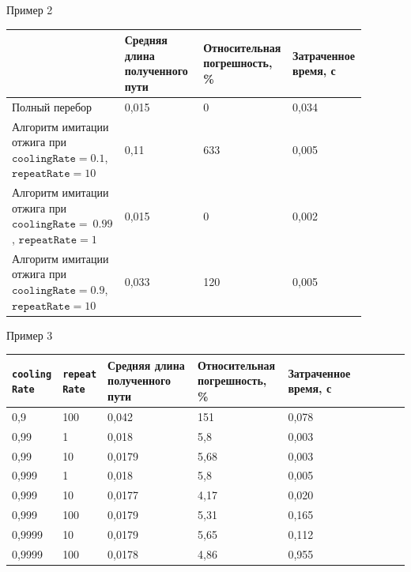 \documentclass[ignoreonframetext,unicode]{beamer}
\begin{document}
\begin{frame}{Пример 2}
\begin{table}[h]
	\small{
	\begin{center}
		\begin{tabular}{|p{0.3\linewidth}|p{0.22\linewidth}|p{0.2\linewidth}|p{0.17\linewidth}|} \hline
			& Средняя длина полученного пути & Относительная погрешность, \% & Затраченное время, с\\ \hline
			Полный перебор                               & 0,015
			& 0   & 0,034 \\ \hline
			Алгоритм имитации отжига при $\texttt{coolingRate}=0.1$, $\texttt{repeatRate}=10$ & 0,11 & 633 & 0,005 \\ \hline
			Алгоритм имитации отжига при $\texttt{coolingRate}=~0.99$, $\texttt{repeatRate}=1$ & 0,015 & 0 & 0,002 \\ \hline
			Алгоритм имитации отжига при $\texttt{coolingRate}=0.9$, $\texttt{repeatRate}=10$ & 0,033 & 120 & 0,005 \\ \hline
		\end{tabular}
	\end{center}
}
\end{table}

\end{frame}

\begin{frame}{Пример 3}
	
\begin{table}[h]
	\small{
	\begin{center}
		\begin{tabular}{|p{0.11\linewidth}|p{0.09\linewidth}|p{0.25\linewidth}|p{0.23\linewidth}|p{0.14\linewidth}|
				p{0.2\linewidth}|} \hline
			\texttt{cooling Rate} & \texttt{repeat Rate} & Средняя длина полученного пути & Относительная погрешность, \% & Затраченное время, с\\ \hline
			0,9 & 100   & 0,042 & 151  & 0,078 \\ \hline
			0,99 & 1   & 0,018 & 5,8  & 0,003 \\ \hline
			0,99 & 10   & 0,0179 & 5,68  & 0,003 \\ \hline
			0,999 & 1   & 0,018 & 5,8  & 0,005 \\ \hline
			0,999 & 10   & 0,0177 & 4,17  & 0,020 \\ \hline
			0,999 & 100   & 0,0179 & 5,31  & 0,165 \\ \hline
			0,9999 & 10   & 0,0179 & 5,65  & 0,112 \\ \hline
			0,9999 & 100   & 0,0178 & 4,86  & 0,955 \\ \hline
		\end{tabular}
	\end{center}
}
\end{table}

\end{frame}	
\end{document}
